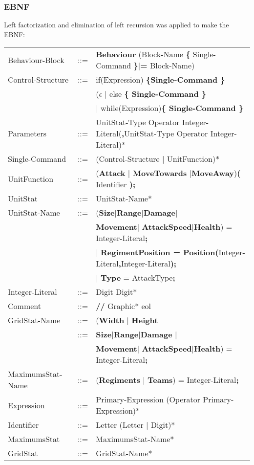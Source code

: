 	\subsubsection{EBNF}
		Left factorization and elimination of left recursion was applied to make the EBNF: \\
		\begin{center}
			\begin{tabular}{ l l p{11cm} }
				Behaviour-Block	   &	::=	 & {\bf Behaviour} (Block-Name {\bf \{} Single-Command {\bf \}}$\mid${\bf = } Block-Name)   \\
				Control-Structure  &  	::=  & if(Expression) \bf{\{}Single-Command \bf{\}}  \\
								   &  	     & ($\epsilon$ $\mid$ else \bf{\{ }Single-Command \bf{\} } \\					   
								   &   		 & $\mid$ while(Expression)\bf{\{ } Single-Command \bf{\}} \\
				Parameters		   &	::=	 & UnitStat-Type Operator Integer-Literal({\bf ,}UnitStat-Type Operator Integer-Literal)* \\
				Single-Command     &	::=  & (Control-Structure $\mid$ UnitFunction)*    				  \\		
				UnitFunction	   &	::=	 & ({\bf Attack} $\mid$ {\bf MoveTowards} $\mid${\bf MoveAway}){\bf (} Identifier {\bf );} \\
		  		UnitStat		   &	::=  & UnitStat-Name*   		  \\
		  		UnitStat-Name	   &	::=	 & ({\bf Size}$\mid${\bf  Range}$\mid${\bf Damage}$\mid$\\
		  						   &    	 &	{\bf Movement}$\mid$ {\bf AttackSpeed}$\mid${\bf Health}) = Integer-Literal{\bf ;} \\ 
								   &	     & $\mid$ {\bf RegimentPosition = Position(}Integer-Literal{\bf ,}Integer-Literal{\bf );} \\
								   &		 & $\mid$ {\bf Type} = AttackType{\bf ;}	     											\\
				Integer-Literal    &	::=  & Digit Digit* \\
				Comment			   &    ::=  & {\bf //} Graphic* eol \\
				GridStat-Name	   &	::=  & ({\bf Width} $\mid$ {\bf Height} \\
									&	::=	 & {\bf Size}$\mid${\bf Range}$\mid${\bf Damage} $\mid$\\
		  						   &    	 & {\bf Movement}$\mid$ {\bf AttackSpeed}$\mid${\bf Health}) = Integer-Literal{\bf ;} \\ 
				MaximumsStat-Name  &	::=  & ({\bf Regiments }$\mid$ {\bf Teams}) =  Integer-Literal{\bf ;} \\
				Expression 		   &	::=	 & Primary-Expression (Operator Primary-Expression)* \\		
				Identifier 		   &    ::=  & Letter (Letter $\mid$ Digit)* \\
				MaximumsStat	   &	::=  & MaximumsStat-Name* \\
				GridStat		   &	::=  & GridStat-Name*  		\\			
			\end{tabular}
		\end{center}					     